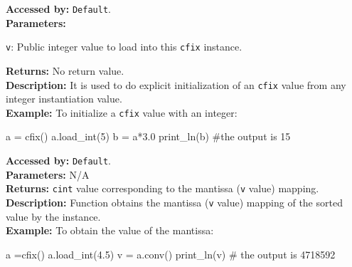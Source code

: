 			\textbf{Accessed by:} \verb|Default|.		 \\
			\textbf{Parameters:}
			\begin{description}
				\item \verb|v|: Public integer value to load into this \verb|cfix| instance.
			\end{description}
			\textbf{Returns:} No return value. \\
			\textbf{Description:}
				 It is used to do explicit initialization of an \verb|cfix| value from any integer instantiation value. \\
	     	\textbf{Example:}
    		    To initialize a \verb|cfix| value with an integer:
		     	\begin{mylisting}
				a = cfix()
				a.load_int(5)
				b = a*3.0
				print_ln(b)  #the output is 15   	
     			\end{mylisting}	 
			\textbf{Accessed by:} \verb|Default|.		 \\
			\textbf{Parameters:} N/A \\
			\textbf{Returns:} \verb|cint| value corresponding to the mantissa (\verb|v| value) mapping. \\
			\textbf{Description:}
				Function obtains the mantissa (\verb|v| value) mapping of the sorted value by the instance. \\
	     	\textbf{Example:}
    		    To obtain the value of the mantissa:
		     	\begin{mylisting}
				a =cfix()
				a.load_int(4.5)
				v = a.conv()
				print_ln(v)  # the output is 4718592   	
     			\end{mylisting}	 
		

